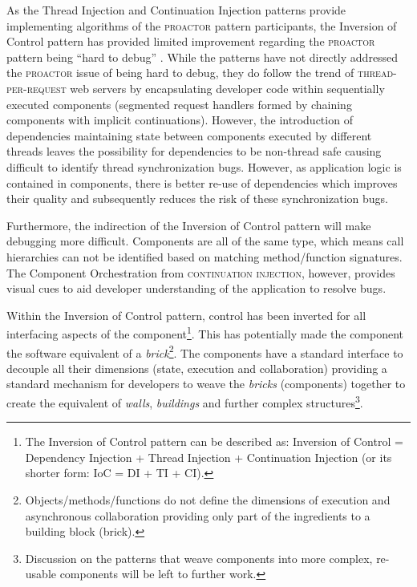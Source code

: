 \documentclass[prodmode]{style/acmlarge}
\begin{document}
As the Thread Injection and Continuation Injection patterns provide implementing
algorithms of the \textsc{proactor} pattern participants, the Inversion of
Control pattern has provided limited improvement regarding the \textsc{proactor}
pattern being ``hard to debug'' \cite[p. 7]{proactor}.  While the patterns have
not directly addressed the \textsc{proactor} issue of being hard to debug, they
do follow the trend of \textsc{thread-per-request} web servers
\cite{thread-per-request} by encapsulating developer code within sequentially
executed components (segmented request handlers formed by chaining components
with implicit continuations).  However, the introduction of dependencies
maintaining state between components executed by different threads leaves the
possibility for dependencies to be non-thread safe causing difficult to identify
thread synchronization bugs.  However, as application logic is contained in
components, there is better re-use of dependencies which improves their quality
and subsequently reduces the risk of these synchronization bugs.

Furthermore, the indirection of the Inversion of Control pattern will make
debugging more difficult.  Components are all of the same type, which means call
hierarchies can not be identified based on matching method/function signatures. 
The Component Orchestration from \textsc{continuation injection}, however,
provides visual cues to aid developer understanding of the application to
resolve bugs.

Within the Inversion of Control pattern, control has been inverted for all
interfacing aspects of the component\footnote{The Inversion of Control pattern
can be described as: Inversion of Control = Dependency Injection + Thread
Injection + Continuation Injection (or its shorter form: IoC = DI + TI + CI).}.
This has potentially made the component the software equivalent of a
\textit{brick}\footnote{Objects/methods/functions do not define the dimensions
of execution and asynchronous collaboration providing only part of the
ingredients to a building block (brick).}.  The components have a standard
interface to decouple all their dimensions (state, execution and collaboration)
providing a standard mechanism for developers to weave the \textit{bricks}
(components) together to create the equivalent of \textit{walls},
\textit{buildings} and further complex structures\footnote{Discussion on the
patterns that weave components into more complex, re-usable components will be
left to further work.}.
\end{document}
